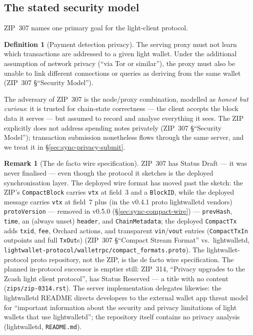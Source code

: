 \documentclass[11pt,a4paper]{article}
\theoremstyle{definition}
\newtheorem{definition}[theorem]{Definition}
\newtheorem{remark}[theorem]{Remark}
\begin{document}
\subsection{The stated security model}\label{sec:sync-privacy-model}

ZIP~307 names one primary goal for the light-client protocol.

\begin{definition}[Payment detection privacy]\label{def:sync-pdp}
The serving proxy must not learn which transactions are addressed to a
given light wallet. Under the additional assumption of network privacy
(``via Tor or similar''), the proxy must also be unable to link different
connections or queries as deriving from the same wallet
(ZIP~307 \S``Security Model'').
\end{definition}

The adversary of ZIP~307 is the node/proxy combination, modelled as
\emph{honest but curious}: it is trusted for chain-state correctness ---
the client accepts the block data it serves --- but assumed to record and
analyse everything it sees. The ZIP explicitly does not address spending
notes privately (ZIP~307 \S``Security Model''); transaction submission
nonetheless flows through the same server, and we treat it in
\S\ref{sec:sync-privacy-submit}.

\begin{remark}[The de facto wire specification]\label{rem:sync-zip307-draft}
ZIP~307 has Status Draft --- it was never finalised --- even though the
protocol it sketches is the deployed synchronisation layer. The deployed
wire format has moved past the sketch: the ZIP's \texttt{CompactBlock}
carries \texttt{vtx} at field~3 and a \texttt{BlockID}, while the deployed
message carries \texttt{vtx} at field~7 plus (in the v0.4.1 proto
\textsf{lightwalletd} vendors) \texttt{protoVersion} --- removed in
v0.5.0 (\S\ref{sec:sync-compact-wire}) --- \texttt{prevHash},
\texttt{time}, an (always unset) \texttt{header}, and
\texttt{ChainMetadata}; the deployed \texttt{CompactTx} adds
\texttt{txid}, \texttt{fee}, Orchard actions, and transparent
\texttt{vin}/\texttt{vout} entries (\texttt{CompactTxIn} outpoints and
full \texttt{TxOut}s) (ZIP~307 \S``Compact Stream Format'' vs.\
\textsf{lightwalletd},
\texttt{lightwallet-protocol/walletrpc/compact\_formats.proto}). The
\textsf{lightwallet-protocol} proto repository, not the ZIP, is the de
facto wire specification. The planned in-protocol successor is emptier
still: ZIP~314, ``Privacy upgrades to the Zcash light client protocol'',
has Status Reserved --- a title with no content
(\texttt{zips/zip-0314.rst}). The server implementation delegates likewise:
the \textsf{lightwalletd} README directs developers to the external wallet
app threat model for ``important information about the security and privacy
limitations of light wallets that use lightwalletd''; the repository itself
contains no privacy analysis (\textsf{lightwalletd}, \texttt{README.md}).
\end{remark}
\end{document}
